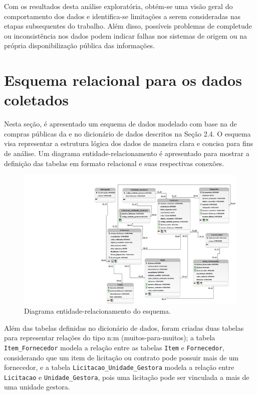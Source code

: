 \documentclass[
	12pt,				%
	oneside,			%
	a4paper,			%
	chapter=TITLE,		%
	section=TITLE,		%
	english,			%
	brazil				%
	]{abntex2}
\begin{document}
Com os resultados desta análise exploratória, obtém-se uma visão geral do comportamento dos dados e identifica-se limitações a serem consideradas nas etapas subsequentes do trabalho. Além disso, possíveis problemas de completude ou inconsistência nos dados podem indicar falhas nos sistemas de origem ou na própria disponibilização pública das informações.

\section{Esquema relacional para os dados coletados}

Nesta seção, é apresentado um esquema de dados modelado com base na  de compras públicas da  e no dicionário de dados descritos na Seção 2.4. O esquema visa representar a estrutura lógica dos dados de maneira clara e concisa para fins de análise. Um diagrama entidade-relacionamento é apresentado para mostrar a definição das tabelas em formato relacional e suas respectivas conexões.

\begin{figure}[h]
\begin{center}
	\caption{\label{fig:diagrama_er}Diagrama entidade-relacionamento do esquema.}
	\includegraphics[trim={17cm 0 0 0},clip,width=\textwidth]{images/modelo_logico_tcc_v4.png} %
\end{center}
\end{figure}

Além das tabelas definidas no dicionário de dados, foram criadas duas tabelas para representar relações do tipo n:m (muitos-para-muitos); a tabela \texttt{Item\_Fornecedor} modela a relação entre as tabelas \texttt{Item} e \texttt{Fornecedor}, considerando que um item de licitação ou contrato pode possuir mais de um fornecedor, e a tabela \texttt{Licitacao\_Unidade\_Gestora} modela a relação entre \texttt{Licitacao} e \texttt{Unidade\_Gestora}, pois uma licitação pode ser vinculada a mais de uma unidade gestora.
\end{document}
